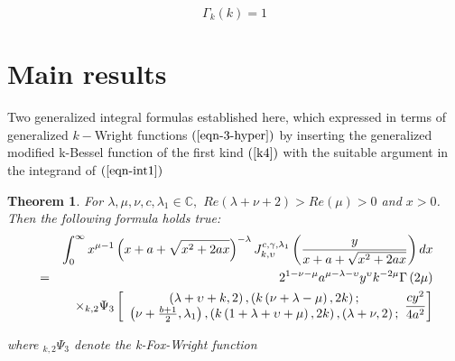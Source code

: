 \documentclass{amsart}
\newtheorem{theorem}{Theorem}
\theoremstyle{plain}
\numberwithin{equation}{section}
\begin{document}
\begin{equation}
\Gamma _{k}\left( k\right) =1  \label{k7}
\end{equation}

\section{Main results}

Two generalized integral formulas established here, which expressed in terms
of generalized $k-$Wright functions $\left( \ref{eqn-3-hyper}\right) $ by
inserting the generalized modified k-Bessel function of the first kind $\left( \ref{k4}\right) $ with the suitable argument in the integrand of $\left( \ref{eqn-int1}\right) $

\begin{theorem}
For $\lambda ,\mu ,\nu ,c,\lambda _{1}\in \mathbb{C},$ $Re\left( \lambda
+\nu +2\right) >Re\left( \mu \right) >0$ and $x>0$. Then the following
formula holds true:\begin{eqnarray}
&&\int_{0}^{\infty }x^{\mu -1}\left( x+a+\sqrt{x^{2}+2ax}\right) ^{-\lambda
}J_{k,\upsilon }^{c,\gamma ,\lambda _{1}}\left( \frac{y}{x+a+\sqrt{x^{2}+2ax}}\right) dx  \notag \\
&=&2^{1-\nu -\mu }a^{\mu -\lambda -\upsilon }y^{\upsilon }k^{-2\mu }\Gamma
\left( 2\mu \right)   \notag \\
&&\times _{k,2}\Psi _{3}\left[ 
\begin{array}{c}
\left( \lambda +\upsilon +k,2\right) ,\left( k\left( \nu +\lambda -\mu
\right) ,2k\right) ; \\ 
\left( \nu +\frac{b+1}{2},\lambda _{1}\right) ,\left( k\left( 1+\lambda
+\upsilon +\mu \right) ,2k\right) ,\left( \lambda +\nu ,2\right) ;\end{array}\frac{cy^{2}}{4a^{2}}\right]   \label{1}
\end{eqnarray}

where $_{k,2}\Psi _{3}$ denote the k-Fox-Wright function \cite{Cerutti}
\end{theorem}
\end{document}
